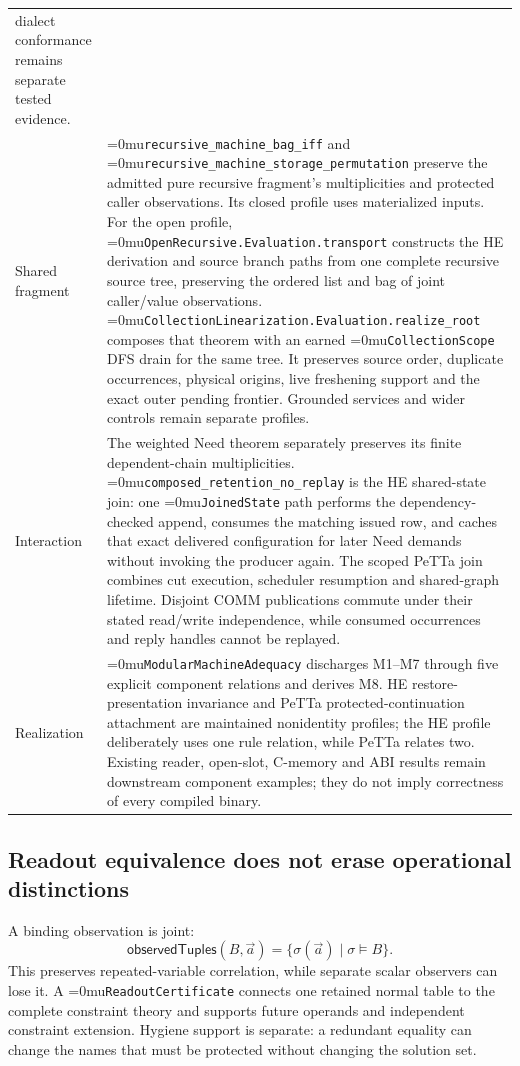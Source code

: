 \documentclass[11pt,a4paper]{article}
\newcommand{\name}[1]{\textup{\Urlmuskip=0mu\relax\nolinkurl{#1}}}
\begin{document}
{\begin{tabularx}{\linewidth}{@{}>{\raggedright\arraybackslash}p{27mm}>{\raggedright\arraybackslash}X@{}}
dialect conformance remains separate tested evidence. \\
Shared fragment &
\name{recursive_machine_bag_iff} and
\name{recursive_machine_storage_permutation} preserve the admitted pure
recursive fragment's multiplicities and protected caller observations. Its
closed profile uses materialized inputs. For the open profile,
\name{OpenRecursive.Evaluation.transport} constructs the HE derivation and
source branch paths from one complete recursive source tree, preserving the
ordered list and bag of joint caller/value observations.
\name{CollectionLinearization.Evaluation.realize_root} composes that theorem
with an earned \name{CollectionScope} DFS drain for the same tree. It preserves
source order, duplicate occurrences, physical origins, live freshening support
and the exact outer pending frontier. Grounded services and wider controls
remain separate profiles. \\
Interaction &
The weighted Need theorem separately preserves its finite dependent-chain
multiplicities. \name{composed_retention_no_replay} is the HE shared-state join:
one \name{JoinedState} path performs the dependency-checked append, consumes the
matching issued row, and caches that exact delivered configuration for later
Need demands without invoking the producer again.  The scoped PeTTa join
combines cut execution, scheduler resumption and shared-graph lifetime.
Disjoint COMM publications commute under their stated read/write independence,
while consumed occurrences and reply handles cannot be replayed. \\
Realization &
\name{ModularMachineAdequacy} discharges M1--M7 through five explicit component
relations and derives M8.  HE restore-presentation invariance and PeTTa
protected-continuation attachment are maintained nonidentity profiles; the HE
profile deliberately uses one rule relation, while PeTTa relates two. Existing
reader, open-slot, C-memory and ABI results remain downstream component
examples; they do not imply correctness of every compiled binary. \\
\bottomrule
\end{tabularx}%
}%
\subsection*{Readout equivalence does not erase operational distinctions}

A binding observation is joint:
\[
  \mathsf{observedTuples}(B,\vec a)
     =\{\sigma(\vec a)\mid\sigma\models B\}.
\]
This preserves repeated-variable correlation, while separate scalar observers
can lose it. A \name{ReadoutCertificate} connects one retained normal table
to the complete constraint theory and supports future operands and independent
constraint extension. Hygiene support is separate: a redundant equality can
change the names that must be protected without changing the solution set.
\end{document}
